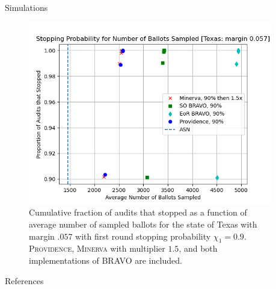 \documentclass[final]{beamer}
\newcommand{\Minerva}{\textsc{Minerva}\xspace}
\newcommand{\Prov}{\textsc{Providence}\xspace}
\newcommand{\BRAVO}{\textsc{BRAVO}\xspace}
\newlength{\sepwidth}
\newlength{\colwidth}
\newcommand{\separatorcolumn}{\begin{column}{\sepwidth}\end{column}}
\begin{document}
\begin{frame}[t]
\begin{columns}[t]
\begin{column}{\colwidth}
\begin{block}{Simulations}
\begin{figure}
\includegraphics[width=.65\textwidth]{prov_asn.png}
\caption{Cumulative fraction of audits that stopped as a function of average number of sampled ballots for the state of Texas with margin $.057$ with first round stopping probability $\chi_1=0.9$. \Prov, \Minerva with multiplier $1.5$, and both implementations of \BRAVO are included.}
\end{figure}



\end{block}

\begin{block}{References}




\end{block}

\end{column}

\separatorcolumn
\end{columns}
\end{frame}
\end{document}
